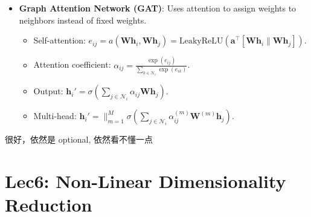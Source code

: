 \documentclass[UTF8]{ctexart}
\begin{document}
\begin{itemize}
\begin{itemize}
        \item \textbf{Graph Attention Network (GAT)}: Uses attention to assign weights to neighbors instead of fixed weights.
        \begin{itemize}
            \item Self-attention: $e_{ij} = a(\mathbf{W}\mathbf{h}_i, \mathbf{W}\mathbf{h}_j) = \text{LeakyReLU}(\mathbf{a}^\top [\mathbf{W}\mathbf{h}_i \| \mathbf{W}\mathbf{h}_j])$.
            \item Attention coefficient: $\alpha_{ij} = \frac{\exp(e_{ij})}{\sum_{k \in \mathcal{N}_i} \exp(e_{ik})}$.
            \item Output: $\mathbf{h}_i' = \sigma \left( \sum_{j \in \mathcal{N}_i} \alpha_{ij} \mathbf{W}\mathbf{h}_j \right)$.
            \item Multi-head: $\mathbf{h}_i' = \|_{m=1}^M \sigma \left( \sum_{j \in \mathcal{N}_i} \alpha_{ij}^{(m)} \mathbf{W}^{(m)}\mathbf{h}_j \right)$.
        \end{itemize}
    \end{itemize}
    很好，依然是 optional, 依然看不懂一点
\end{itemize}

\section{Lec6: Non-Linear Dimensionality Reduction}
\end{document}
